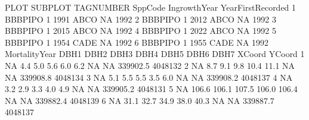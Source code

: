 \documentclass{article}
\begin{document}
\begin{Schunk}
\begin{Soutput}
     PLOT SUBPLOT TAGNUMBER SppCode IngrowthYear YearFirstRecorded
1 BBBPIPO       1      1991    ABCO           NA              1992
2 BBBPIPO       1      2012    ABCO           NA              1992
3 BBBPIPO       1      2015    ABCO           NA              1992
4 BBBPIPO       1      2022    ABCO           NA              1992
5 BBBPIPO       1      1954    CADE           NA              1992
6 BBBPIPO       1      1955    CADE           NA              1992
  MortalityYear  DBH1  DBH2  DBH3  DBH4  DBH5 DBH6 DBH7   XCoord  YCoord
1            NA   4.4   5.0   5.6   6.0   6.2   NA   NA 339902.5 4048132
2            NA   8.7   9.1   9.8  10.4  11.1   NA   NA 339908.8 4048134
3            NA   5.1   5.5   5.5   3.5   6.0   NA   NA 339908.2 4048137
4            NA   3.2   2.9   3.3   4.0   4.9   NA   NA 339905.2 4048131
5            NA 106.6 106.1 107.5 106.0 106.4   NA   NA 339882.4 4048139
6            NA  31.1  32.7  34.9  38.0  40.3   NA   NA 339887.7 4048137
\end{Soutput}
\end{Schunk}
\end{document}
